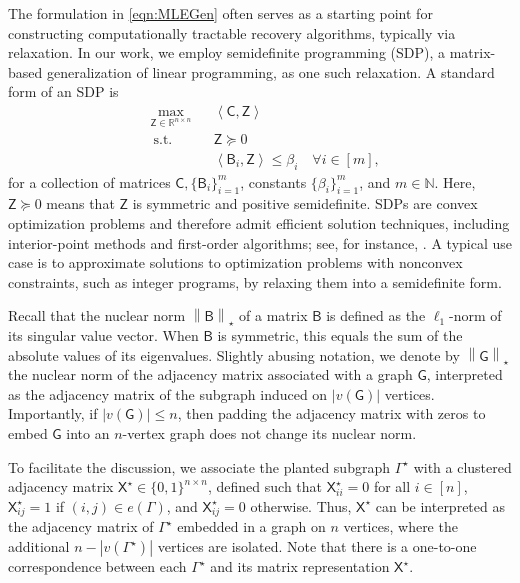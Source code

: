 \documentclass[12pt]{article}
\newcommand{\norm}[1]{\left\|#1\right\|}
\newcommand{\innerP}[1]{\left\langle#1\right\rangle}
\newcommand{\s}[1]{\mathsf{#1}}
\begin{document}
The formulation in \eqref{eqn:MLEGen} often serves as a starting point for constructing computationally tractable recovery algorithms, typically via relaxation. In our work, we employ semidefinite programming (SDP), a matrix-based generalization of linear programming, as one such relaxation. A standard form of an SDP is
\begin{equation}
\begin{aligned}
&\underset{\s{Z}\in\mathbb{R}^{n\times n}}{\max}
& & \innerP{\s{C},\s{Z}} \\
& \ \text{s.t.}
& &  \s{Z}\succeq 0\\
&&& \innerP{\s{B}_i,\s{Z}}\leq \beta_i\quad\forall i\in[m],
\end{aligned}\label{eqn:GenSDP}
\end{equation}
for a collection of matrices $\s{C},\{\s{B}_i\}_{i=1}^m$, constants $\{\beta_i\}_{i=1}^m$, and $m\in\mathbb{N}$. Here, $\s{Z} \succeq 0$ means that $\s{Z}$ is symmetric and positive semidefinite. SDPs are convex optimization problems and therefore admit efficient solution techniques, including interior-point methods and first-order algorithms; see, for instance, \cite{nesterov1987interior,boyd2004convex}. A typical use case is to approximate solutions to optimization problems with nonconvex constraints, such as integer programs, by relaxing them into a semidefinite form.

Recall that the nuclear norm $\norm{\s{B}}_{\star}$ of a matrix $\s{B}$ is defined as the $\ell_1$-norm of its singular value vector. When $\s{B}$ is symmetric, this equals the sum of the absolute values of its eigenvalues. Slightly abusing notation, we denote by $\norm{\s{G}}_\star$ the nuclear norm of the adjacency matrix associated with a graph $\s{G}$, interpreted as the adjacency matrix of the subgraph induced on $|v(\s{G})|$ vertices. Importantly, if $|v(\s{G})| \leq n$, then padding the adjacency matrix with zeros to embed $\s{G}$ into an $n$-vertex graph does not change its nuclear norm.

To facilitate the discussion, we associate the planted subgraph $\Gamma^\star$ with a clustered adjacency matrix $\s{X}^\star \in \{0,1\}^{n \times n}$, defined such that $\s{X}^\star_{ii} = 0$ for all $i \in [n]$, $\s{X}^\star_{ij} = 1$ if $(i,j) \in e(\Gamma)$, and $\s{X}^\star_{ij} = 0$ otherwise. Thus, $\s{X}^\star$ can be interpreted as the adjacency matrix of $\Gamma^\star$ embedded in a graph on $n$ vertices, where the additional $n-|v(\Gamma^\star)|$ vertices are isolated. Note that there is a one-to-one correspondence between each $\Gamma^\star$ and its matrix representation $\s{X}^\star$.
\end{document}
